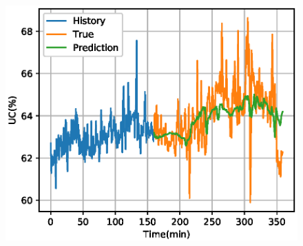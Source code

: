 \begin{figure}[t]
{\begin{minipage}[t]{0.33\linewidth}
\includegraphics[width=\linewidth,trim=12 0 0 20,clip]{figures/chapter3/predict_cmp/UC_GRU_sta_euler_200.eps}
\end{minipage}%
\label{fig:subfig_200_sta_euler}
}%
\hspace{-22pt}
\end{figure}
